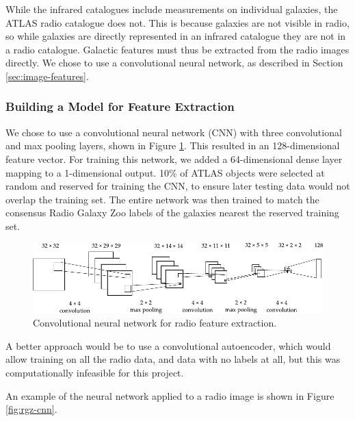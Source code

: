     While the infrared catalogues include measurements on individual galaxies,
    the ATLAS radio catalogue does not. This is because galaxies are not
    visible in radio, so while galaxies are directly represented in an infrared
    catalogue they are not in a radio catalogue. Galactic features must thus be
    extracted from the radio images directly. We chose to use a convolutional
    neural network, as described in Section \ref{sec:image-features}.

    \subsubsection{Building a Model for Feature Extraction}
    \label{sec:feature-extraction-model}

      We chose to use a convolutional neural network (CNN) with three
      convolutional and max pooling layers, shown in Figure \ref{fig:radio-cnn}.
      This resulted in an 128-dimensional feature vector. For training this
      network, we added a 64-dimensional dense layer mapping to a 1-dimensional
      output. 10\% of ATLAS objects were selected at random and reserved for
      training the CNN, to ensure later testing data would not overlap the
      training set. The entire network was then trained to match the consensus
      Radio Galaxy Zoo labels of the galaxies nearest the reserved training set.

      \begin{figure}[!ht]
         \centering
         \includegraphics[width=\textwidth]{images/cnn_new.pdf}
         \caption{Convolutional neural network for radio feature extraction.}
         \label{fig:radio-cnn}
       \end{figure}

      A better approach would be to use a convolutional autoencoder, which would
      allow training on all the radio data, and data with no labels at all, but
      this was computationally infeasible for this project.

      An example of the neural network applied to a radio image is shown in
      Figure \ref{fig:rgz-cnn}.

